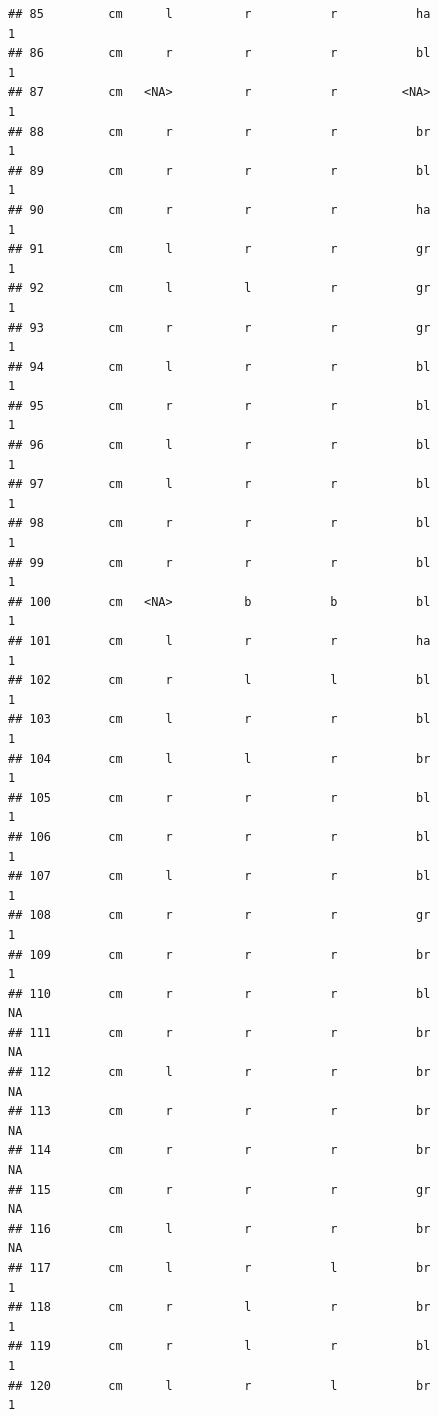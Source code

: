 \documentclass[]{article}
\begin{document}
\begin{verbatim}
## 85         cm      l          r           r           ha             1
## 86         cm      r          r           r           bl             1
## 87         cm   <NA>          r           r         <NA>             1
## 88         cm      r          r           r           br             1
## 89         cm      r          r           r           bl             1
## 90         cm      r          r           r           ha             1
## 91         cm      l          r           r           gr             1
## 92         cm      l          l           r           gr             1
## 93         cm      r          r           r           gr             1
## 94         cm      l          r           r           bl             1
## 95         cm      r          r           r           bl             1
## 96         cm      l          r           r           bl             1
## 97         cm      l          r           r           bl             1
## 98         cm      r          r           r           bl             1
## 99         cm      r          r           r           bl             1
## 100        cm   <NA>          b           b           bl             1
## 101        cm      l          r           r           ha             1
## 102        cm      r          l           l           bl             1
## 103        cm      l          r           r           bl             1
## 104        cm      l          l           r           br             1
## 105        cm      r          r           r           bl             1
## 106        cm      r          r           r           bl             1
## 107        cm      l          r           r           bl             1
## 108        cm      r          r           r           gr             1
## 109        cm      r          r           r           br             1
## 110        cm      r          r           r           bl            NA
## 111        cm      r          r           r           br            NA
## 112        cm      l          r           r           br            NA
## 113        cm      r          r           r           br            NA
## 114        cm      r          r           r           br            NA
## 115        cm      r          r           r           gr            NA
## 116        cm      l          r           r           br            NA
## 117        cm      l          r           l           br             1
## 118        cm      r          l           r           br             1
## 119        cm      r          l           r           bl             1
## 120        cm      l          r           l           br             1

\end{verbatim}
\end{document}
